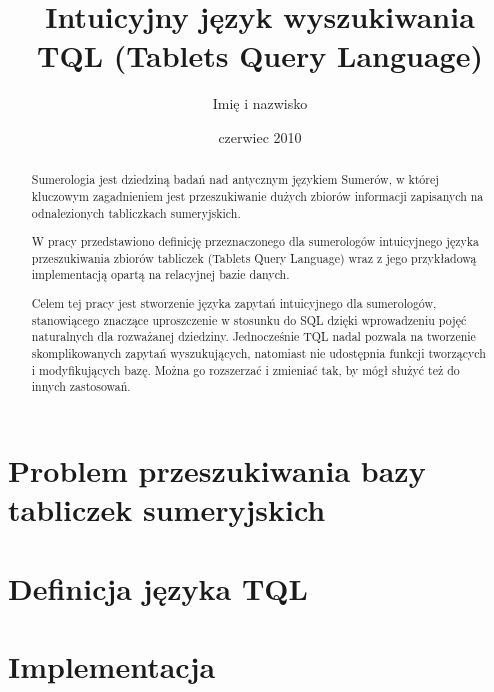\documentclass{pracamgr}
\author{Imię i nazwisko}
\title{Intuicyjny język wyszukiwania TQL (Tablets Query Language)}
\date{czerwiec 2010}
\begin{document}
\maketitle

\begin{abstract}
Sumerologia jest dziedziną badań nad antycznym językiem Sumerów, w której
kluczowym zagadnieniem jest przeszukiwanie dużych zbiorów informacji
zapisanych na odnalezionych tabliczkach sumeryjskich.

W pracy przedstawiono definicję przeznaczonego dla sumerologów intuicyjnego
języka przeszukiwania zbiorów tabliczek (Tablets Query Language) wraz z jego
przykładową implementacją opartą na relacyjnej bazie danych.

Celem tej pracy jest stworzenie języka zapytań intuicyjnego dla sumerologów,
stanowiącego znaczące uproszczenie w stosunku do SQL dzięki wprowadzeniu pojęć 
naturalnych dla rozważanej dziedziny. Jednocześnie TQL nadal
pozwala na tworzenie skomplikowanych zapytań wyszukujących, natomiast nie 
udostępnia funkcji tworzących i modyfikujących bazę. Można go rozszerzać 
i zmieniać tak, by mógł służyć też do innych zastosowań.
\end{abstract}

\tableofcontents



\part{Problem przeszukiwania bazy tabliczek sumeryjskich}




\part{Definicja języka TQL}


\part{Implementacja}





\end{document}
